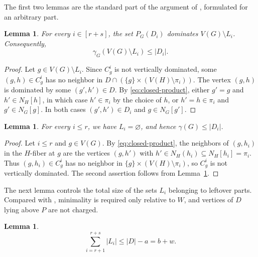 \documentclass[10pt]{amsart}
\newtheorem{lemma}[theorem]{Lemma}
\theoremstyle{remark}
\newcommand{\N}{N}
\newcommand{\V}{V}
\newcommand{\PG}{P_G}
\begin{document}
The first two lemmas are the standard part of the argument of
\cite{Bresar2017,Steiner2026}, formulated for an arbitrary part.

\begin{lemma}\label{lem:horizontal}
For every $i\in[r+s]$, the set $\PG(D_i)$ dominates $\V(G)\setminus L_i$.
Consequently,
\[
 \gamma_G(\V(G)\setminus L_i)\leq|D_i|.
\]
\end{lemma}

\begin{proof}
Let $g\in\V(G)\setminus L_i$. Since $C_g^i$ is not vertically dominated,
some $(g,h)\in C_g^i$ has no neighbor in
$D\cap(\{g\}\times(\V(H)\setminus\pi_i))$. The vertex $(g,h)$ is dominated
by some $(g',h')\in D$. By \eqref{eq:closed-product}, either $g'=g$ and
$h'\in\N_H[h]$, in which case $h'\in\pi_i$ by the choice of $h$, or
$h'=h\in\pi_i$ and $g'\in\N_G[g]$. In both cases
$(g',h')\in D_i$ and $g\in\N_G[g']$.
\end{proof}

\begin{lemma}\label{lem:packing-L-empty}
For every $i\leq r$, we have $L_i=\varnothing$, and hence
$\gamma(G)\leq|D_i|$.
\end{lemma}

\begin{proof}
Let $i\leq r$ and $g\in\V(G)$. By \eqref{eq:closed-product}, the neighbors
of $(g,h_i)$ in the $H$-fiber at $g$ are the vertices $(g,h')$ with
$h'\in\N_H(h_i)\subseteq\N_H[h_i]=\pi_i$. Thus $(g,h_i)\in C_g^i$ has no
neighbor in $\{g\}\times(\V(H)\setminus\pi_i)$, so $C_g^i$ is not vertically
dominated. The second assertion follows from Lemma~\ref{lem:horizontal}.
\end{proof}

The next lemma controls the total size of the sets $L_i$ belonging to leftover
parts. Compared with \cite{Bresar2017,Steiner2026}, minimality is required only
relative to $W$, and vertices of $D$ lying above $P$ are not charged.

\begin{lemma}\label{lem:sum-L}
\[
 \sum_{i=r+1}^{r+s}|L_i|\leq |D|-a=b+w.
\]
\end{lemma}
\end{document}
